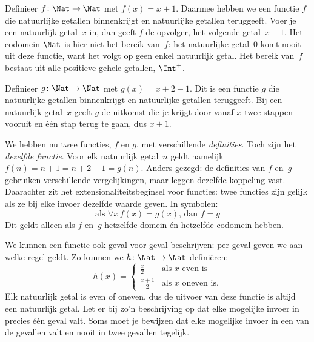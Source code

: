 \documentclass[openany]{memoir}
\begin{document}
\begin{ex}
Definieer $f \colon \Nat \to \Nat$ met $f(x) = x+1$. Daarmee hebben we een
functie $f$ die natuurlijke getallen binnenkrijgt en natuurlijke getallen
teruggeeft. Voer je een natuurlijk getal~$x$ in, dan geeft $f$ de opvolger,
het volgende getal~$x+1$. Het codomein $\Nat$ is hier niet het bereik van~$f$:
het natuurlijke getal~$0$ komt nooit uit deze functie, want het volgt op geen enkel
natuurlijk getal. Het bereik van~$f$ bestaat uit alle positieve gehele
getallen, $\Int^{+}$.
\end{ex}

\begin{ex}
Definieer $g \colon \Nat \to \Nat$ met $g(x) = x+2-1$. Dit is een functie
$g$ die natuurlijke getallen binnenkrijgt en natuurlijke getallen teruggeeft.
Bij een natuurlijk getal~$x$ geeft $g$ de uitkomst die je krijgt door vanaf
$x$ twee stappen vooruit en één stap terug te gaan, dus $x+1$.
\end{ex}

\begin{explain}
We hebben nu twee functies, $f$ en $g$, met verschillende \emph{definities}.
Toch zijn het \emph{dezelfde functie}. Voor elk natuurlijk getal~$n$ geldt
namelijk $f(n) = n+1 = n+2-1 = g(n)$. Anders gezegd: de definities van $f$
en~$g$ gebruiken verschillende vergelijkingen, maar leggen dezelfde koppeling
vast. Daarachter zit het extensionaliteitsbeginsel voor functies: twee functies
zijn gelijk als ze bij elke invoer dezelfde waarde geven. In symbolen:
\[
  \text{als }\forall x\, f(x) = g(x)\text{, dan }f = g
\]
Dit geldt alleen als $f$ en~$g$ hetzelfde domein én hetzelfde codomein hebben.
\end{explain}

\begin{ex}
We kunnen een functie ook geval voor geval beschrijven: per geval geven we aan
welke regel geldt. Zo kunnen we $h \colon \Nat \to \Nat$ definiëren:
\[
h(x) =
\begin{cases}
  \frac{x}{2} & \text{als $x$ even is} \\
  \frac{x+1}{2} & \text{als $x$ oneven is.}
\end{cases}
\]
Elk natuurlijk getal is even of oneven, dus de uitvoer van deze functie is
altijd een natuurlijk getal. Let er bij zo'n beschrijving op dat elke mogelijke
invoer in precies één geval valt. Soms moet je bewijzen dat elke mogelijke
invoer in een van de gevallen valt en nooit in twee gevallen tegelijk.
\end{ex}
\endgroup
\end{document}
